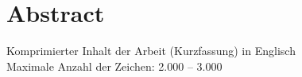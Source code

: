 \newpage
{}
\chapter*{Abstract}
Komprimierter Inhalt der Arbeit (Kurzfassung) in Englisch
\\Maximale Anzahl der Zeichen: 2.000 – 3.000
\\
\\
\blindtext[1]
\clearpage